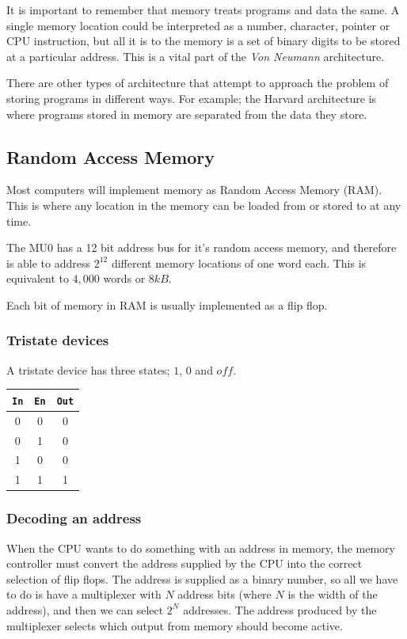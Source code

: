 It is important to remember that memory treats programs and data the same. A
single memory location could be interpreted as a number, character, pointer or
CPU instruction, but all it is to the memory is a set of binary digits to be
stored at a particular address. This is a vital part of the {\it Von Neumann}
architecture.

There are other types of architecture that attempt to approach the problem of
storing programs in different ways. For example; the Harvard architecture is
where programs stored in memory are separated from the data they store.

\subsection{Random Access Memory}

Most computers will implement memory as Random Access Memory (RAM). This is
where any location in the memory can be loaded from or stored to at any time.

The MU0 has a 12 bit address bus for it's random access memory, and therefore is
able to address $2^12$ different memory locations of one word each. This is
equivalent to $4,000$ words or $8kB$.

Each bit of memory in RAM is usually implemented as a flip flop.

\subsubsection{Tristate devices}

A tristate device has three states; $1$, $0$ and $off$.

\begin{center}
	\begin{tabular}{|c|c|c|}
		{\tt In} & {\tt En} & {\tt Out}\\ \hline
		0 & 0 & 0\\
		0 & 1 & 0\\
		1 & 0 & 0\\
		1 & 1 & 1\\
	\end{tabular}
\end{center}

\subsubsection{Decoding an address}

When the CPU wants to do something with an address in memory, the memory
controller must convert the address supplied by the CPU into the correct
selection of flip flops. The address is supplied as a binary number, so all we
have to do is have a multiplexer with $N$ address bits (where $N$ is the width
of the address), and then we can select $2^N$ addresses. The address produced by
the multiplexer selects which output from memory should become active.

